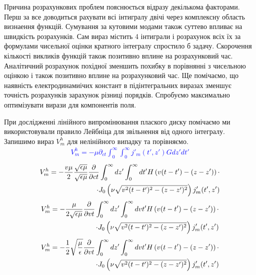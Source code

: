 Причина розрахункових проблем пояснюється відразу декількома факторами.
Перш за все доводиться рахувати всі інтигралу двічі через комплексну область 
визнаення функцій. Сумування за кутовими модами також суттево впливає на 
швидкість розрахунків. Сам вираз містить 4 інтиграли і розрахунок всіх їх за 
формулами чисельної оцінки кратного інтегралу спростило б задачу. Скорочення 
кількості викликів функцій також позитивно вплине на розрахунковий час. 
Аналітичний розрахунок похідної зменшить похибку в порівнянні з чисельною 
оцінкою і також позитивно вплине на розрахунковий час. Ще помічаємо, що 
наявність електродинамиічих констант в підінтегральних виразах зменшує точність 
розрахунків зарахунок різниці порядків. Спробуємо максимально оптимізувати 
вирази для компонентів поля.

При дослідженні лінійного випромінювання плаского диску помічаємо ми 
використовували правило Лейбніца для звільнення від одного інтегралу.
Запишимо вираз $ V_m^h $ для нелінійного випадку та порівняємо.
%
\textcolor{blue} { \begin{equation*} \begin{aligned} 
V_m^h = - \mu \partial_{ct} \int_0^\infty \int_0^\infty j'_m (t',z') G dz' dt'
\end{aligned} \end{equation*} }
%
\textcolor{blue} { \begin{equation*} \begin{aligned} 
V_m^h = - \frac{v \mu}{2} \frac{\sqrt{\epsilon \mu}}{\sqrt{\epsilon \mu}} 
\frac{\partial }{\partial ct} \int_0^\infty dz' \int_0^\infty 
dt' H \left( v (t-t') - (z-z') \right) \cdot \\
\cdot J_0 \left( \nu \sqrt{v^2 (t-t')^2 - (z-z')^2} \right) j'_m (t',z')
\end{aligned} \end{equation*} }
%
\textcolor{blue} { \begin{equation*} \begin{aligned} 
V_m^h = - \frac{\mu}{2 \sqrt{\epsilon \mu}} \frac{\partial }{\partial vt} 
\int_0^\infty dz' \int_0^\infty dvt' 
H \left( v (t-t') - (z-z') \right) \cdot \\
\cdot J_0 \left( \nu \sqrt{v^2 (t-t')^2 - (z-z')^2} \right) j'_m (t',z')
\end{aligned} \end{equation*} }
%
\textcolor{blue} { \begin{equation*} \begin{aligned} 
V_m^h = - \frac{1}{2} \sqrt{\frac{\mu}{\epsilon}} \frac{\partial }{\partial vt} 
\int_0^\infty dz' \int_0^\infty dvt' 
H \left( v (t-t') - (z-z') \right) \cdot \\
\cdot J_0 \left( \nu \sqrt{v^2 (t-t')^2 - (z-z')^2} \right) j'_m (t',z')
\end{aligned} \end{equation*} }
